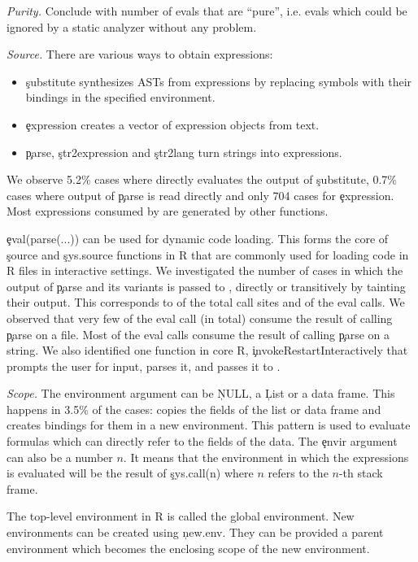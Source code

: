 \documentclass[USenglish,cleveref, autoref, thm-restate]{lipics-v2019}
\newcommand{\mypara}[1]{\medskip\noindent\emph{#1}\xspace}
\begin{document}
\mypara{Purity.}
Conclude with number of evals that are ``pure'', i.e. evals which
could be ignored by a static analyzer without any problem.

\mypara{Source.}
There are various ways to obtain expressions:
\begin{itemize}
  \item \c{substitute} synthesizes ASTs from expressions by replacing
    symbols with their bindings in the specified environment.
  \item \c{expression}  creates a vector of expression
    objects from text.
  \item \c{parse}, \c{str2expression} and \c{str2lang} turn strings into
    expressions.
\end{itemize}

We observe 5.2\% cases where \eval directly evaluates the output of
\c{substitute}, 0.7\% cases where output of \c{parse} is read directly
and only 704 cases for \c{expression}. Most expressions consumed by
\eval are generated by other functions.

\c{eval(parse(...))} can be used for dynamic code loading. This forms
the core of \c{source} and \c{sys.source} functions in R that are
commonly used for loading code in R files in interactive settings. We
investigated the number of cases in which the output of \c{parse} and
its variants is passed to \eval, directly or transitively by tainting
their output. This corresponds to \PercentParsedCallSites of the total
\eval call sites and \PercentParsedEvals of the eval calls. We
observed that very few of the eval call (\NbParseFilesRnd in total)
consume the result of calling \c{parse} on a file. Most of the eval
calls consume the result of calling \c{parse} on a string. We also
identified one function in core R, \c{invokeRestartInteractively} that
prompts the user for input, parses it, and passes it to \eval.


\mypara{Scope.} The environment argument can be \c{NULL}, a \c{List}
or a data frame. This happens in 3.5\% of the cases: \eval copies the
fields of the list or data frame and creates bindings for them in a
new environment. This pattern is used to evaluate formulas which can
directly refer to the fields of the data. The \c{envir} argument can
also be a number $n$. It means that the environment in which the
expressions is evaluated will be the result of \c{sys.call(n)} where
$n$ refers to the $n$-th stack frame.

The top-level environment in R is called the global environment. New
environments can be created using \c{new.env}. They can be provided a
parent environment which becomes the enclosing scope of the new
environment.
\end{document}
